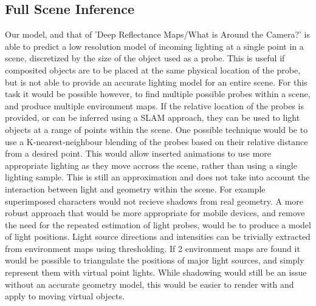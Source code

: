 \documentclass[ %
                    author={Gavin Parker},
                supervisor={Dr. Neill Campbell},
                    degree={MEng},
                     title={Deep Siamese Networks for Illumination Estimation from Stereo Images},
                  subtitle={},
                      type={research},
                      year={2018} ]{dissertation}
\begin{document}
\subsection{Full Scene Inference}
Our model, and that of 'Deep Reflectance Maps/What is Around the Camera?' is able to predict a low resolution model of incoming lighting at a single point in a scene, discretized by the size of the object used as a probe. This is useful if composited objects are to be placed at the same physical location of the probe, but is not able to provide an accurate lighting model for an entire scene. For this task it would be possible however, to find multiple possible probes within a scene, and produce multiple environment maps. If the relative location of the probes is provided, or can be inferred using a SLAM approach, they can be used to light objects at a range of points within the scene. One possible technique would be to use a K-nearest-neighbour blending of the probes based on their relative distance from a desired point. This would allow inserted animations to use more appropriate lighting as they move accross the scene, rather than using a single lighting sample. This is still an approximation and does not take into account the interaction between light and geometry within the scene. For example superimposed characters would not recieve shadows from real geometry. A more robust approach that would be more appropriate for mobile devices, and remove the need for the repeated estimation of light probes, would be to produce a model of light positions. Light source directions and intensities can be trivially extracted from environment maps using thresholding. If 2 environment maps are found it would be possible to triangulate the positions of major light sources, and simply represent them with virtual point lights. While shadowing would still be an issue without an accurate geometry model, this would be easier to render with and apply to moving virtual objects.
\end{document}
